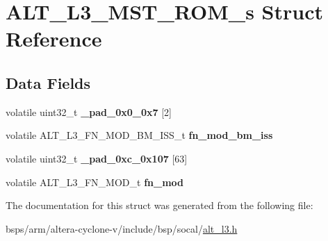 \hypertarget{structALT__L3__MST__ROM__s}{}\section{A\+L\+T\+\_\+\+L3\+\_\+\+M\+S\+T\+\_\+\+R\+O\+M\+\_\+s Struct Reference}
\label{structALT__L3__MST__ROM__s}
\subsection*{Data Fields}
\begin{DoxyCompactItemize}
\item 
\mbox{\label{structALT__L3__MST__ROM__s_ac9401f78e5b2e0ddb9eab8bc1b69a96e}} 
volatile uint32\+\_\+t {\bfseries \+\_\+pad\+\_\+0x0\+\_\+0x7} \mbox{[}2\mbox{]}
\item 
\mbox{\label{structALT__L3__MST__ROM__s_a1a74605d17c4219602de83b57b0be9c5}} 
volatile A\+L\+T\+\_\+\+L3\+\_\+\+F\+N\+\_\+\+M\+O\+D\+\_\+\+B\+M\+\_\+\+I\+S\+S\+\_\+t {\bfseries fn\+\_\+mod\+\_\+bm\+\_\+iss}
\item 
\mbox{\label{structALT__L3__MST__ROM__s_a6c71a545c73565f80623a75fba15f56d}} 
volatile uint32\+\_\+t {\bfseries \+\_\+pad\+\_\+0xc\+\_\+0x107} \mbox{[}63\mbox{]}
\item 
\mbox{\label{structALT__L3__MST__ROM__s_a9a0b332f89793231e4d681f27b7eaf1e}} 
volatile A\+L\+T\+\_\+\+L3\+\_\+\+F\+N\+\_\+\+M\+O\+D\+\_\+t {\bfseries fn\+\_\+mod}
\end{DoxyCompactItemize}


The documentation for this struct was generated from the following file\+:\begin{DoxyCompactItemize}
\item 
bsps/arm/altera-\/cyclone-\/v/include/bsp/socal/\mbox{\hyperlink{alt__l3_8h}{alt\+\_\+l3.\+h}}\end{DoxyCompactItemize}
